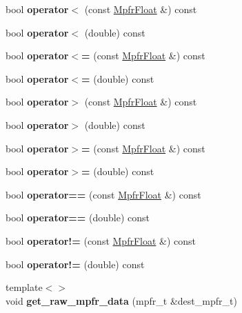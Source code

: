 \begin{DoxyCompactItemize}
bool {\bfseries operator$<$} (const \hyperlink{class_mpfr_float}{Mpfr\+Float} \&) const
\item 
\mbox{\label{class_mpfr_float_a3e9f01eef5ed128a38131f75d3b0bd3a}} 
bool {\bfseries operator$<$} (double) const
\item 
\mbox{\label{class_mpfr_float_a93625bf014bb4cf1c841ab3587d9c1c4}} 
bool {\bfseries operator$<$=} (const \hyperlink{class_mpfr_float}{Mpfr\+Float} \&) const
\item 
\mbox{\label{class_mpfr_float_a92c0d7b6225f45ccee4c8c9797ca70ae}} 
bool {\bfseries operator$<$=} (double) const
\item 
\mbox{\label{class_mpfr_float_a2fba5909639e2bdeeb7ce5414c05f3f1}} 
bool {\bfseries operator$>$} (const \hyperlink{class_mpfr_float}{Mpfr\+Float} \&) const
\item 
\mbox{\label{class_mpfr_float_a166f35b91654f9e2431df40b95354060}} 
bool {\bfseries operator$>$} (double) const
\item 
\mbox{\label{class_mpfr_float_a036d170037e1ef0caa63f6deadfac07e}} 
bool {\bfseries operator$>$=} (const \hyperlink{class_mpfr_float}{Mpfr\+Float} \&) const
\item 
\mbox{\label{class_mpfr_float_a63987a7ce1d8ed177cfc83666bcf940f}} 
bool {\bfseries operator$>$=} (double) const
\item 
\mbox{\label{class_mpfr_float_a19927b80f5c6e2891d34f9f2db4029de}} 
bool {\bfseries operator==} (const \hyperlink{class_mpfr_float}{Mpfr\+Float} \&) const
\item 
\mbox{\label{class_mpfr_float_abf46ec39ed5872fd0f7de2ec749c3500}} 
bool {\bfseries operator==} (double) const
\item 
\mbox{\label{class_mpfr_float_af4718b3be363b5ef3a9a763ff5b54886}} 
bool {\bfseries operator!=} (const \hyperlink{class_mpfr_float}{Mpfr\+Float} \&) const
\item 
\mbox{\label{class_mpfr_float_aa335cd3452d48f14dca094be50a725c1}} 
bool {\bfseries operator!=} (double) const
\item 
\mbox{\label{class_mpfr_float_a8c44e086174a941b2024e3dafcfd7843}} 
{\footnotesize template$<$$>$ }\\void {\bfseries get\+\_\+raw\+\_\+mpfr\+\_\+data} (mpfr\+\_\+t \&dest\+\_\+mpfr\+\_\+t)
\end{DoxyCompactItemize}
